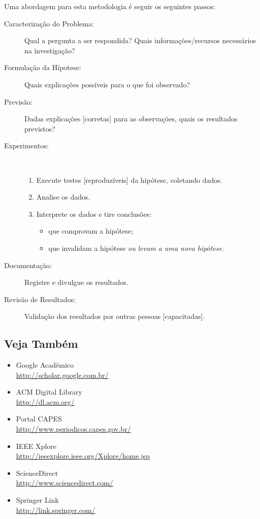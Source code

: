 Uma abordagem para esta metodologia é seguir os seguintes passos:
\begin{description}
	\item[Caracterização do Problema:] Qual a pergunta a ser respondida? Quais
informações/recursos necessários na investigação?
	\item[Formulação da Hípotese:] Quais explicações possíveis para o que foi observado?
	\item[Previsão:] Dadas explicações [corretas] para as observações, quais os
	resultados previstos?
	\item[Experimentos:] \ \\\vspace{-2em}
		\begin{enumerate}
			\item Execute testes [reproduzíveis] da hipótese, coletando dados.
			\item Analise os dados.
			\item Interprete os dados e tire conclusões:
				\begin{itemize}
				\item que comprovam a hipótese;
				\item que invalidam a hipótese \emph{ou levam a uma nova hipótese}.
				\end{itemize}
		\end{enumerate}
	\item[Documentação:] Registre e divulgue os resultados.
	\item[Revisão de Resultados:] Validação dos resultados por outras pessoas
	[capacitadas].
\end{description}%

\subsection{Veja Também}
\begin{itemize}
	\item Google Acadêmico
		\\\url{http://scholar.google.com.br/}%
	\item ACM Digital Library
		\\\url{http://dl.acm.org/}%
	\item Portal \acrshort{CAPES}
		\\\url{http://www.periodicos.capes.gov.br/}%
	\item IEEE Xplore
		\\\url{http://ieeexplore.ieee.org/Xplore/home.jsp}%
	\item ScienceDirect
		\\\url{http://www.sciencedirect.com/}%
	\item Springer Link
		\\\url{http://link.springer.com/}%
\end{itemize}

